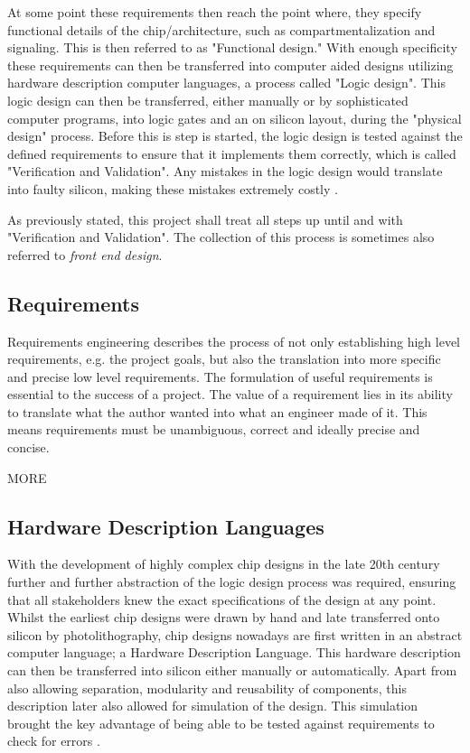 At some point these requirements then reach the point where, they specify functional details of the chip/architecture, such as compartmentalization and signaling. This is then referred to as "Functional design." With enough specificity these requirements can then be transferred into computer aided designs utilizing hardware description computer languages, a process called "Logic design". This logic design can then be transferred, either manually or by sophisticated computer programs, into logic gates and an on silicon layout, during the "physical design"  process. Before this is step is started, the logic design is tested against the defined requirements to ensure that it implements them correctly, which is called "Verification and Validation". Any mistakes in the logic design would translate into faulty silicon, making these mistakes extremely costly \cite{chipdesignflow1} \cite{chipdesignflow2}.

As previously stated, this project shall treat all steps up until and with "Verification and Validation". The collection of this process is sometimes also referred to \textit{front end design}.

\subsection{Requirements}
Requirements engineering describes the process of not only establishing high level requirements, e.g. the project goals, but also the translation into more specific and precise low level requirements. The formulation of useful requirements is essential to the success of a project. The value of a requirement lies in its ability to translate what the author wanted into what an engineer made of it. This means requirements must be unambiguous, correct and ideally precise and concise. \cite{cite.needed}

MORE

\subsection{Hardware Description Languages}
With the development of highly complex chip designs in the late 20th century further and further abstraction of the logic design process was required, ensuring that all stakeholders knew the exact specifications of the design at any point. Whilst the earliest chip designs were drawn by hand and late transferred onto silicon by photolithography, chip designs nowadays are first written in an abstract computer language; a Hardware Description Language. This hardware description can then be transferred into silicon either manually or automatically.  Apart from also allowing separation, modularity and reusability of components, this description later also allowed for simulation of the design. This simulation brought the key advantage of being able to be tested against requirements to check for errors \cite{histverilog} \cite{1214355}.

